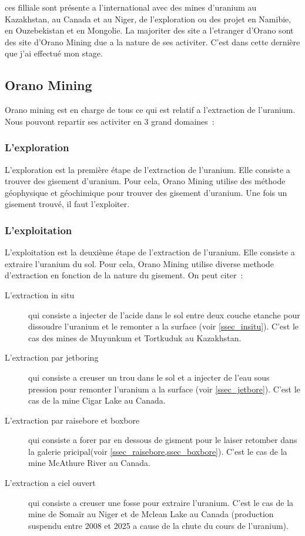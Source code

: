 ces filliale sont présente a l'international avec des mines d'uranium au Kazakhstan, au Canada et au Niger, de l'exploration ou des projet en Namibie, en Ouzebekistan et en Mongolie. La majoriter des site a l'etranger d'Orano sont des site d'Orano Mining due a la nature de ses activiter. C'est dans cette dernière que j'ai effectué mon stage.
\subsection{Orano Mining}

Orano mining est en charge de tous ce qui est relatif a l'extraction de l'uranium. Nous pouvont repartir ses activiter en 3 grand domaines~:
\subsubsection{L'exploration}
L'exploration est la première étape de l'extraction de l'uranium. Elle consiste a trouver des gisement d'uranium. Pour cela, Orano Mining utilise des méthode géophysique et géochimique pour trouver des gisement d'uranium. Une fois un gisement trouvé, il faut l'exploiter.

\subsubsection{L'exploitation}
L'exploitation est la deuxième étape de l'extraction de l'uranium. Elle consiste a extraire l'uranium du sol. Pour cela, Orano Mining utilise diverse methode d'extraction en fonction de la nature du gisement. On peut citer~:
\begin{description}
    \item [L'extraction in situ] qui consiste a injecter de l'acide dans le sol entre deux couche etanche pour dissoudre l'uranium et le remonter a la surface (voir \cref{ssec_insitu}). C'est le cas des mines de Muyunkum et Tortkuduk au Kazakhstan.
    \item [L'extraction par jetboring] qui consiste a creuser un trou dans le sol et a injecter de l'eau sous pression pour remonter l'uranium a la surface (voir \cref{ssec_jetbore}). C'est le cas de la mine Cigar Lake au Canada.
    \item [L'extraction par raisebore et boxbore] qui consiste a forer par en dessous de gisment pour le laiser retomber dans la galerie pricipal(voir \cref{ssec_raisebore,ssec_boxbore}). C'est le cas de la mine McAthure River au Canada.
    \item [L'extraction a ciel ouvert] qui consiste a creuser une fosse pour extraire l'uranium. C'est le cas de la mine de Somaïr au Niger et de Mclean Lake au Canada (production suspendu entre 2008 et 2025 a cause de la chute du cours de l'uranium).
\end{description}

